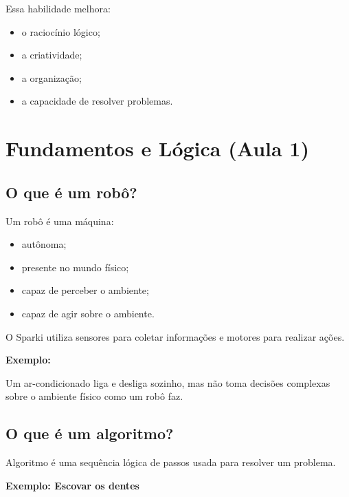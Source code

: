 \documentclass[conference]{IEEEtran}
\begin{document}
Essa habilidade melhora:
\begin{itemize}
    \item o raciocínio lógico;
    \item a criatividade;
    \item a organização;
    \item a capacidade de resolver problemas.
\end{itemize}

\vspace{0.5cm}

\section{Fundamentos e Lógica (Aula 1)}

\subsection{O que é um robô?}

Um robô é uma máquina:

\begin{itemize}
    \item autônoma;
    \item presente no mundo físico;
    \item capaz de perceber o ambiente;
    \item capaz de agir sobre o ambiente.
\end{itemize}

O Sparki utiliza sensores para coletar informações e motores para realizar ações.

\vspace{0.2cm}

\textbf{Exemplo:}

Um ar-condicionado liga e desliga sozinho, mas não toma decisões complexas sobre o ambiente físico como um robô faz.

\subsection{O que é um algoritmo?}

Algoritmo é uma sequência lógica de passos usada para resolver um problema.

\vspace{0.2cm}

\textbf{Exemplo: Escovar os dentes}
\end{document}

